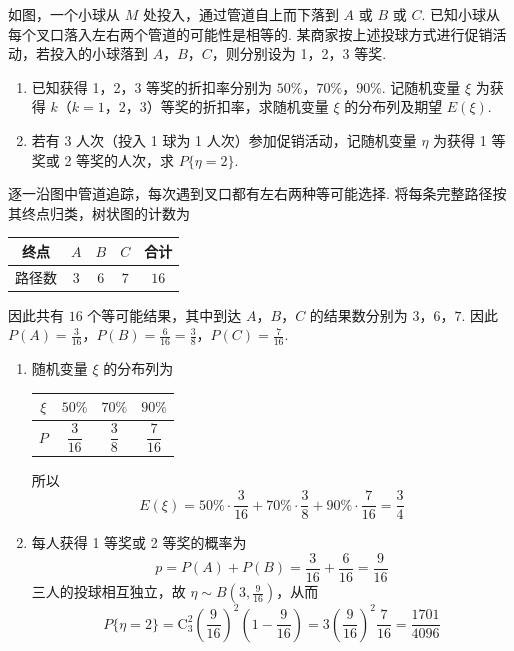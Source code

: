 \begin{problem}
如图，一个小球从 \(M\) 处投入，通过管道自上而下落到 \(A\) 或 \(B\) 或 \(C\). 已知小球从每个叉口落入左右两个管道的可能性是相等的. 某商家按上述投球方式进行促销活动，若投入的小球落到 \(A\)，\(B\)，\(C\)，则分别设为 1，2，3 等奖.

\begin{enumerate}
\item 已知获得 1，2，3 等奖的折扣率分别为 \(50\%\)，\(70\%\)，\(90\%\). 记随机变量 \(\xi\) 为获得 \(k\)（\(k = 1\)，\(2\)，\(3\)）等奖的折扣率，求随机变量 \(\xi\) 的分布列及期望 \(E(\xi)\).
\item 若有 3 人次（投入 1 球为 1 人次）参加促销活动，记随机变量 \(\eta\) 为获得 1 等奖或 2 等奖的人次，求 \(P\{\eta = 2\}\).
\end{enumerate}


\begin{solution}
逐一沿图中管道追踪，每次遇到叉口都有左右两种等可能选择. 将每条完整路径按其终点归类，树状图的计数为
\begin{center}
\begin{tabular}{c|ccc|c}
终点 & \(A\) & \(B\) & \(C\) & 合计\\ \hline
路径数 & \(3\) & \(6\) & \(7\) & \(16\)
\end{tabular}
\end{center}
因此共有 \(16\) 个等可能结果，其中到达 \(A\)，\(B\)，\(C\) 的结果数分别为 \(3\)，\(6\)，\(7\). 因此
\(P(A)=\frac3{16}\)，\(P(B)=\frac6{16}=\frac38\)，\(P(C)=\frac7{16}\).

\begin{enumerate}
\item 随机变量 \(\xi\) 的分布列为
\begin{center}
\begin{tabular}{c|ccc}
\(\xi\)&\(50\%\)&\(70\%\)&\(90\%\)\\ \hline
\(P\)&\(\dfrac3{16}\)&\(\dfrac38\)&\(\dfrac7{16}\)
\end{tabular}
\end{center}
所以
\[
E(\xi)=50\%\cdot\frac3{16}+70\%\cdot\frac38+90\%\cdot\frac7{16}=\frac34
\]

\item 每人获得 1 等奖或 2 等奖的概率为
\[
p=P(A)+P(B)=\frac3{16}+\frac6{16}=\frac9{16}
\]
三人的投球相互独立，故 \(\eta\sim B(3,\frac9{16})\)，从而
\[
P\{\eta=2\}=\mathrm C_3^2\left(\frac9{16}\right)^2\left(1-\frac9{16}\right)
=3\left(\frac9{16}\right)^2\frac7{16}
=\frac{1701}{4096}
\]
\end{enumerate}
\end{solution}
\end{problem}

